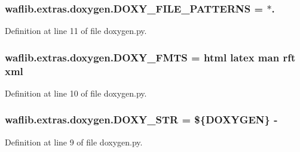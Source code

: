 \subsubsection[{\texorpdfstring{D\+O\+X\+Y\+\_\+\+F\+I\+L\+E\+\_\+\+P\+A\+T\+T\+E\+R\+NS}{DOXY_FILE_PATTERNS}}]{ waflib.\+extras.\+doxygen.\+D\+O\+X\+Y\+\_\+\+F\+I\+L\+E\+\_\+\+P\+A\+T\+T\+E\+R\+NS = \textquotesingle{}$\ast$.\textquotesingle{}}\hypertarget{namespacewaflib_1_1extras_1_1doxygen_a91d61f4139f6eebad45d431919e2b6b9}{}\label{namespacewaflib_1_1extras_1_1doxygen_a91d61f4139f6eebad45d431919e2b6b9}


Definition at line 11 of file doxygen.\+py.

\subsubsection[{\texorpdfstring{D\+O\+X\+Y\+\_\+\+F\+M\+TS}{DOXY_FMTS}}]{ waflib.\+extras.\+doxygen.\+D\+O\+X\+Y\+\_\+\+F\+M\+TS = \textquotesingle{}html latex man rft xml\textquotesingle{}}\hypertarget{namespacewaflib_1_1extras_1_1doxygen_a5183bc960b5d24c46b421e8cae986e58}{}\label{namespacewaflib_1_1extras_1_1doxygen_a5183bc960b5d24c46b421e8cae986e58}


Definition at line 10 of file doxygen.\+py.

\subsubsection[{\texorpdfstring{D\+O\+X\+Y\+\_\+\+S\+TR}{DOXY_STR}}]{ waflib.\+extras.\+doxygen.\+D\+O\+X\+Y\+\_\+\+S\+TR = \textquotesingle{}\$\{D\+O\+X\+Y\+G\+EN\} -\/ \textquotesingle{}}\hypertarget{namespacewaflib_1_1extras_1_1doxygen_aeb6b3faf3a58b1af3cfb170c43d6d391}{}\label{namespacewaflib_1_1extras_1_1doxygen_aeb6b3faf3a58b1af3cfb170c43d6d391}


Definition at line 9 of file doxygen.\+py.

